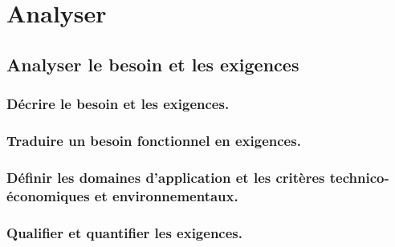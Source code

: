 \documentclass[10pt,fleqn]{book}
\newcommand{\repRel}{../..}
\newcommand{\repStyle}{\repRel/Style}
\begin{document}
\def\xxcompetences{}
\def\xxfigures{}
\graphicspath{{\repStyle/png/}}
\setlength{\columnseprule}{.1pt}

\def\xxpartie{}
\def\xxnumpartie{}
\def\xxchapitre{}
\def\xxnumchapitre{}
\def\xxactivite{DDS 3}
\def\xxtitreexo{Les ptits devoirs du soir}
\def\xxsourceexo{Xavier Pessoles}

\pagestyle{fancy}
\thispagestyle{plain}
\vspace{4.5cm}
\proffalse

\chapter{Analyser} 

\section{Analyser le besoin et les exigences} 

\subsection{Décrire le besoin et les exigences.} 

\begin{multicols}{2} 

\end{multicols}

\subsection{Traduire un besoin fonctionnel en exigences.} 

\begin{multicols}{2} 

\end{multicols}

\subsection{Définir les domaines d’application et les critères technico-économiques et environnementaux.} 

\begin{multicols}{2} 

\end{multicols}

\subsection{Qualifier et quantifier les exigences.} 
\end{document}
